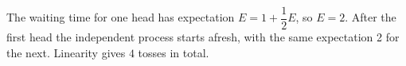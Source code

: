 The waiting time for one head has expectation $ E=1+\dfrac{1}{2}E $, so $ E=2 $. After the first head the independent process starts afresh, with the same expectation 2 for the next. Linearity gives $\boxed4 $ tosses in total.
